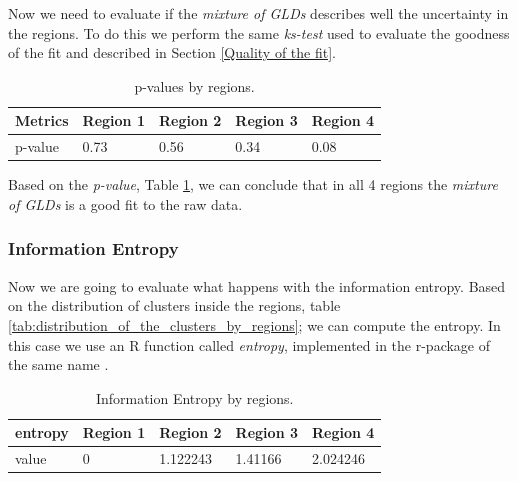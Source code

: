 Now we need to evaluate if the \textit{mixture of GLDs} describes well the uncertainty in the regions. To do this we perform the same \textit{ks-test} used to evaluate the goodness of the fit and described in Section \ref{Quality of the fit}. 

\begin{table}[H]
\begin{center}
    \begin{tabular}{|l|l|l|l|l|}
    \hline
    \textbf{Metrics} & \textbf{Region 1} &  \textbf{Region 2} &  \textbf{Region 3} &   \textbf{Region 4}  \\ \hline
    p-value     & 0.73   		& 0.56 & 0.34 & 0.08            \\ \hline
    \end{tabular}
    \caption {p-values by regions.}
    \label{tab:p_values_by_regions}
    \end{center}
\end{table}

Based on the \textit{p-value}, Table \ref{tab:p_values_by_regions}, we can conclude that in all 4 regions the \textit{mixture of GLDs} is a good fit to the raw data.

\subsubsection{Information Entropy}\label{informationEntropyresults}
Now we are going to evaluate what happens with the information entropy. Based on the distribution of clusters inside the regions, table \ref{tab:distribution_of_the_clusters_by_regions}; we can compute the entropy. In this case we use an R function called \textit{entropy}, implemented in the r-package of the same name  \cite{Hausser2008}.

\begin{table}[H]
\begin{center}
    \begin{tabular}{|l|l|l|l|l|}
    \hline
    \textbf{entropy} & \textbf{Region 1} &  \textbf{Region 2} &  \textbf{Region 3} &   \textbf{Region 4}  \\ \hline
    value     & 0   		& 1.122243 & 1.41166 & 2.024246            \\ \hline
    \end{tabular}
    \caption {Information Entropy by regions.}
    \label{tab:entropy_by_regions}
    \end{center}
\end{table}


